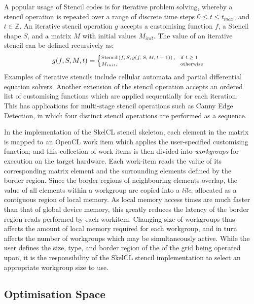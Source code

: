 \documentclass[nonatbib,preprint,9pt]{sigplanconf}
\begin{document}
A popular usage of Stencil codes is for iterative problem solving,
whereby a stencil operation is repeated over a range of discrete time
steps $0 \le t \le t_{max}$, and $t \in \mathbb{Z}$. An iterative
stencil operation $g$ accepts a customising function $f$, a Stencil
shape $S$, and a matrix $M$ with initial values $M_{init}$. The value
of an iterative stencil can be defined recursively as:
%
\begin{equation}
\scriptsize
g(f, S, M, t) =
\begin{cases}
  \stencil \left( f, S, g(f, S, M, t-1) \right),& \text{if } t \geq 1\\
  M_{init}, & \text{otherwise}
\end{cases}
\end{equation}
%
Examples of iterative stencils include cellular automata and partial
differential equation solvers. Another extension of the stencil
operation accepts an ordered list of customising functions which are
applied sequentially for each iteration. This has applications for
multi-stage stencil operations such as Canny Edge Detection, in which
four distinct stencil operations are performed as a sequence.

In the implementation of the SkelCL stencil skeleton, each element in
the matrix is mapped to an OpenCL work item which applies the
user-specified customising function; and this collection of work items
is then divided into \emph{workgroups} for execution on the target
hardware. Each work-item reads the value of its corresponding matrix
element and the surrounding elements defined by the border
region. Since the border regions of neighbouring elements overlap, the
value of all elements within a workgroup are copied into a
\emph{tile}, allocated as a contiguous region of local memory. As
local memory access times are much faster than that of global device
memory, this greatly reduces the latency of the border region reads
performed by each workitem. Changing size of workgroups thus affects
the amount of local memory required for each workgroup, and in turn
affects the number of workgroups which may be simultaneously
active. While the user defines the size, type, and border region of
the of the grid being operated upon, it is the responsibility of the
SkelCL stencil implementation to select an appropriate workgroup size
to use.

\subsection{Optimisation Space}\label{subsec:op-params}
\end{document}
